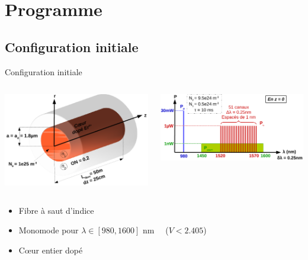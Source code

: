 \documentclass{beamer}
\begin{document}
\section{Programme}

\subsection{Configuration initiale}

\begin{frame}{Configuration initiale}{}
  
  \begin{columns}[c]
  \begin{column}{.5\paperwidth}
    \includegraphics[width=.49\paperwidth]{schema_fibre.pdf}
  \end{column}
  \begin{column}{.5\paperwidth}
    \includegraphics[width=.49\paperwidth]{schema_puiss.pdf}
  \end{column}
\end{columns}
  
  \vspace{0.5cm}
  \begin{itemize}
  \item Fibre à saut d'indice
  \item Monomode pour $\lambda \in [980 ,1600]$ nm ~~($V<2.405$)
  \item C\oe ur entier dopé
  \end{itemize}
  
\end{frame}
\end{document}
